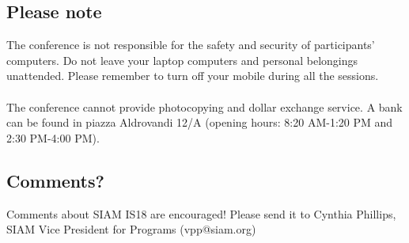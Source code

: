 \begin{multicols}{2}
\subsection*{Please note}
The conference is not responsible for the safety and security of participants' computers. Do not leave your laptop computers and personal belongings unattended. Please remember to turn off your mobile during all the sessions.\\\\ The conference cannot provide photocopying and dollar exchange service. A bank can be found in piazza Aldrovandi 12/A (opening hours: 8:20 AM-1:20 PM and 2:30 PM-4:00 PM).
\subsection*{Comments?}
Comments about SIAM IS18 are encouraged! Please send it to Cynthia Phillips, SIAM Vice President for Programs (vpp@siam.org)
\end{multicols}
